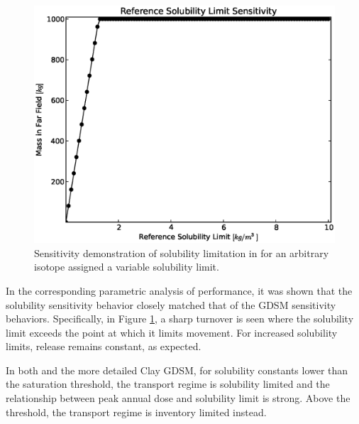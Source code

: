 \begin{figure}[ht]
\begin{center}
\includegraphics[width=0.7\linewidth]{./results/images/sol.eps}
\caption[Solubility Sensitivity in the Mixed Cell Model]{Sensitivity demonstration of solubility limitation in \Cyder for an arbitrary isotope assigned a variable solubility limit.}
\label{fig:sol_result}
\end{center}
\end{figure}


In the corresponding parametric analysis of \Cyder performance, it was shown that the
solubility sensitivity behavior closely matched that of the \gls{GDSM}
sensitivity behaviors. Specifically, in Figure \ref{fig:sol_result}, a sharp turnover
is seen where the solubility limit exceeds the point at which it limits
movement. For increased solubility limits, release remains constant, as
expected.

In both \Cyder and the more detailed Clay \gls{GDSM}, for solubility constants
lower than the saturation threshold, the transport regime is solubility
limited and the relationship between peak annual dose and solubility limit is
strong.  Above the threshold, the transport regime is inventory limited
instead.


